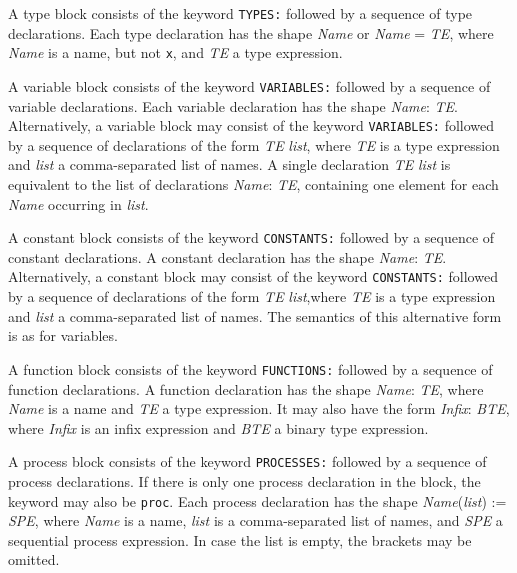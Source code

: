 \documentclass[adraft]{eptcs}
\begin{document}
A type block consists of the keyword {\tt TYPES:} followed by a sequence of type declarations.
Each type declaration has the shape \textit{Name} or \textit{Name} = \textit{TE}, where \textit{Name}
is a name, but not {\tt x}, and \textit{TE} a type expression.

A variable block consists of the keyword {\tt VARIABLES:} followed by a sequence of variable declarations.
Each variable declaration has the shape  \textit{Name}: \textit{TE}.
Alternatively, a variable block may consist of the keyword {\tt VARIABLES:} followed by a sequence of declarations of the
form  \textit{TE} \textit{list}, where \textit{TE} is a type expression and \textit{list} a comma-separated list of names.
A single declaration \textit{TE} \textit{list} is equivalent to the list of declarations
\textit{Name}: \textit{TE}, containing one element for each \textit{Name} occurring in \textit{list}.

A constant block consists of the keyword {\tt CONSTANTS:} followed by a sequence of constant declarations.
A constant declaration has the shape \textit{Name}: \textit{TE}.
Alternatively, a constant block may consist of the keyword {\tt CONSTANTS:} followed by a sequence of declarations of the
form  \textit{TE} \textit{list},\pagebreak[3] where \textit{TE} is a type expression and \textit{list} a comma-separated list of names.
The semantics of this alternative form is as for variables.

A function block consists of the keyword {\tt FUNCTIONS:} followed by a sequence of function declarations.
A function declaration has the shape \textit{Name}: \textit{TE}, where \textit{Name} is a name
and \textit{TE} a type expression. It may also have the form \textit{Infix}: \textit{BTE},
where \textit{Infix} is an infix expression and \textit{BTE} a binary type expression.


A process block consists of the keyword {\tt PROCESSES:} followed by a sequence of process declarations.
If there is only one process declaration in the block, the keyword may also be {\tt proc}.
Each process declaration has the shape \textit{Name}(\textit{list}) := \textit{SPE}, where
\textit{Name} is a name, \textit{list} is a comma-separated list of names, and \textit{SPE} a sequential process expression.
In case the list is empty, the brackets may be omitted.
\end{document}
